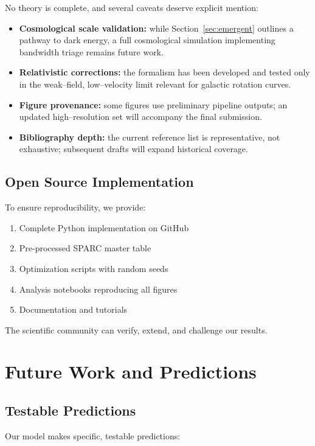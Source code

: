 \documentclass[twocolumn,prd,amsmath,amssymb,aps,superscriptaddress,nofootinbib]{revtex4-2}
\begin{document}
No theory is complete, and several caveats deserve explicit mention:
\begin{itemize}
  \item \textbf{Cosmological scale validation:} while Section~\ref{sec:emergent} outlines a pathway to dark energy, a full cosmological simulation implementing bandwidth triage remains future work.
  \item \textbf{Relativistic corrections:} the formalism has been developed and tested only in the weak--field, low--velocity limit relevant for galactic rotation curves.
  \item \textbf{Figure provenance:} some figures use preliminary pipeline outputs; an updated high–resolution set will accompany the final submission.
  \item \textbf{Bibliography depth:} the current reference list is representative, not exhaustive; subsequent drafts will expand historical coverage.
\end{itemize}

\subsection{Open Source Implementation}

To ensure reproducibility, we provide:
\begin{enumerate}
\item Complete Python implementation on GitHub
\item Pre-processed SPARC master table
\item Optimization scripts with random seeds
\item Analysis notebooks reproducing all figures
\item Documentation and tutorials
\end{enumerate}

The scientific community can verify, extend, and challenge our results.

\section{Future Work and Predictions}
\label{sec:future}

\subsection{Testable Predictions}

Our model makes specific, testable predictions:
\end{document}
